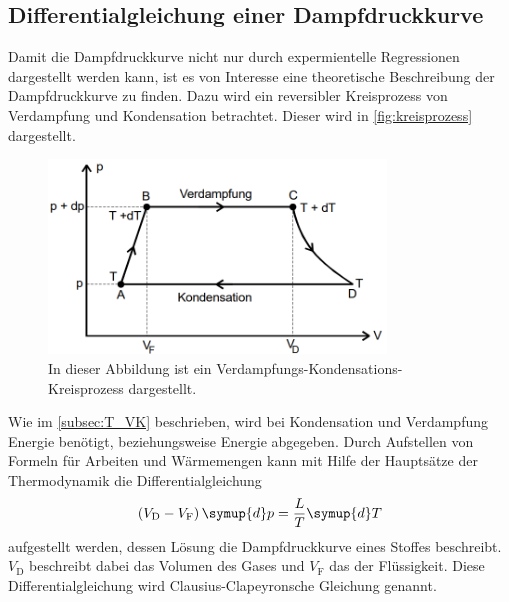 \subsection{Differentialgleichung einer Dampfdruckkurve}
\label{subsec:T_DGL}
Damit die Dampfdruckkurve nicht nur durch expermientelle Regressionen dargestellt werden kann, ist es von Interesse eine theoretische Beschreibung der Dampfdruckkurve zu finden. Dazu wird 
ein reversibler Kreisprozess von Verdampfung und Kondensation betrachtet. Dieser wird in \autoref{fig:kreisprozess} dargestellt.

\begin{figure}
    \centering
    \includegraphics[width=0.8\textwidth]{content/kreisprozess.PNG}
	\caption{In dieser Abbildung ist ein Verdampfungs-Kondensations-Kreisprozess dargestellt. \cite{v203}}
	\label{fig:kreisprozess}
\end{figure}

Wie im \autoref{subsec:T_VK} beschrieben, wird bei Kondensation und Verdampfung Energie benötigt, beziehungsweise Energie abgegeben. Durch Aufstellen von Formeln für Arbeiten und Wärmemengen kann mit Hilfe
der Hauptsätze der Thermodynamik die Differentialgleichung 
\begin{equation}
    \label{eqn:DGL1}
    \left(V_\text{D} - V_\text{F}\right)\symup{d}p = \frac{L}{T}\symup{d}T
\end{equation}
aufgestellt werden, dessen Lösung die Dampfdruckkurve eines Stoffes beschreibt. $V_\text{D}$ beschreibt dabei das Volumen des Gases und $V_\text{F}$ das der Flüssigkeit.
Diese Differentialgleichung wird Clausius-Clapeyronsche Gleichung genannt.
